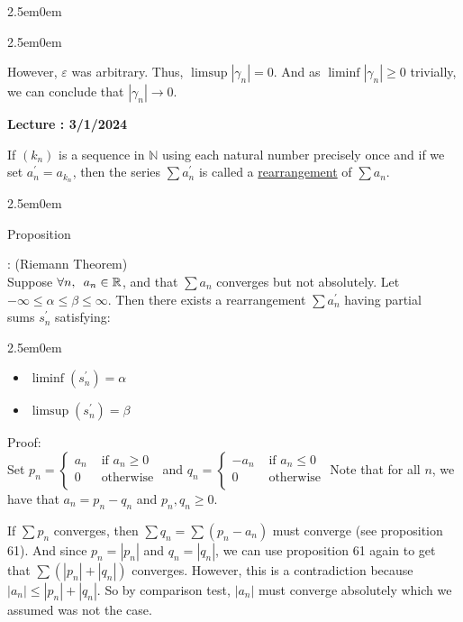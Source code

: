 \documentclass{book}
\newcommand{\hTwo}{%
   \color{MidnightBlue}%
   \fontsize{13}{15}\selectfont%
}
\newcommand{\hThree}{%
   \color{PineGreen}
   \fontsize{13}{15}\selectfont%
}
\newenvironment{myIndent}{%
   \begin{adjustwidth}{2.5em}{0em}%
}{%
   \end{adjustwidth}%
}
\newcommand{\udefine}[1]{%
   \setulcolor{Red}%
   \setul{0.14em}{0.07em}%
   \ul{#1}%
}
\newcommand{\retTwo}{\hfill\bigbreak}
\newcounter{LectureNumber}
\newcommand*{\markLecture}[1]{%
   \stepcounter{LectureNumber}%
   {\huge \color{Black} \textbf{Lecture \theLectureNumber: #1} \newline}%
}
\newcommand{\myHS}{ \hspace{0.5em}}
\newcounter{PropNumber}
\newcommand{\propCount}[1][1]{%
   \addtocounter{PropNumber}{#1}%
   \thePropNumber%
}
\begin{document}
{\begin{myIndent}
{\begin{myIndent}
         However, $\varepsilon$ was arbitrary. Thus, $\limsup{|\gamma_n|} = 0$. And as $\liminf{|\gamma_n|} \geq 0$ trivially, we can conclude that $|\gamma_n| \rightarrow 0$. \retTwo
      \end{myIndent}}
   \end{myIndent}}

   \markLecture{3/1/2024}

   If $(k_n)$ is a sequence in $\mathbb{N}$ using each natural number precisely once and if we set $a^\prime_n = a_{k_n}$, then the series $\sum a^\prime_n$ is called a \udefine{rearrangement} of $\sum a_n$.\retTwo
   
   {\begin{myIndent}\hTwo
      Proposition \propCount: (Riemann Theorem)\\
      Suppose $\forall n, \myHS a_n \in \mathbb{R}$, and that $\sum a_n$ converges but not absolutely. Let\\ $-\infty \leq \alpha \leq \beta \leq \infty$. Then there exists a rearrangement $\sum a_n^\prime$ having partial\\ sums $s^\prime_n$ satisfying:
      \begin{myIndent}
         \begin{itemize}
            \item $\liminf(s^\prime_n) = \alpha$
            \item $\limsup(s^\prime_n) = \beta$
         \end{itemize}
         \hThree
         \newpage

         Proof:\\
         Set $p_n = \left\{
         \begin{matrix}
            a_n & \text{ if } a_n \geq 0\\
            0 & \text{ otherwise}\\
         \end{matrix}\right.$ and $q_n = \left\{
         \begin{matrix}
            -a_n & \text{ if } a_n \leq 0\\
            0 & \text{ otherwise}\\
         \end{matrix}\right.$\retTwo
         Note that for all $n$, we have that $a_n = p_n - q_n$ and $p_n, q_n \geq 0$.\retTwo

         If $\sum p_n$ converges, then $\sum q_n = \sum(p_n - a_n)$ must converge (see proposition 61). And since $p_n = |p_n|$ and $q_n = |q_n|$, we can use proposition 61 again to get that $\sum(|p_n| + |q_n|)$ converges. However, this is a contradiction because $|a_n| \leq |p_n| + |q_n|$. So by comparison test, $|a_n|$ must converge absolutely which we assumed was not the case. \retTwo


\end{myIndent}
\end{myIndent}}
\end{document}
